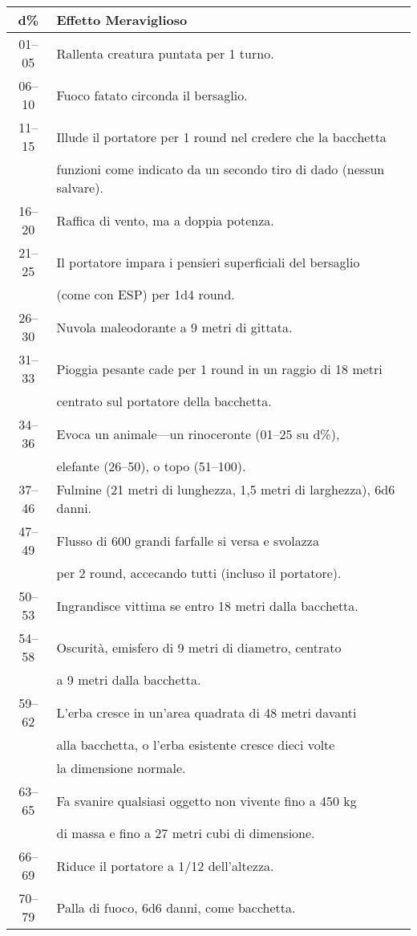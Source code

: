 \documentclass{article}
\begin{document}
\begin{multicols}{2}
\begin{table}[h]
\centering
\begin{tabular}{|c|l|}
\hline
\textbf{d\%} & \textbf{Effetto Meraviglioso} \\
\hline
01–05 & Rallenta creatura puntata per 1 turno. \\
06–10 & Fuoco fatato circonda il bersaglio. \\
11–15 & Illude il portatore per 1 round nel credere che la bacchetta \\
& funzioni come indicato da un secondo tiro di dado (nessun salvare). \\
16–20 & Raffica di vento, ma a doppia potenza. \\
21–25 & Il portatore impara i pensieri superficiali del bersaglio \\
& (come con ESP) per 1d4 round. \\
26–30 & Nuvola maleodorante a 9 metri di gittata. \\
31–33 & Pioggia pesante cade per 1 round in un raggio di 18 metri \\
& centrato sul portatore della bacchetta. \\
34–36 & Evoca un animale—un rinoceronte (01–25 su d\%), \\
& elefante (26–50), o topo (51–100). \\
37–46 & Fulmine (21 metri di lunghezza, 1,5 metri di larghezza), 6d6 danni. \\
47–49 & Flusso di 600 grandi farfalle si versa e svolazza \\
& per 2 round, accecando tutti (incluso il portatore). \\
50–53 & Ingrandisce vittima se entro 18 metri dalla bacchetta. \\
54–58 & Oscurità, emisfero di 9 metri di diametro, centrato \\
& a 9 metri dalla bacchetta. \\
59–62 & L'erba cresce in un'area quadrata di 48 metri davanti \\
& alla bacchetta, o l'erba esistente cresce dieci volte \\
& la dimensione normale. \\
63–65 & Fa svanire qualsiasi oggetto non vivente fino a 450 kg \\
& di massa e fino a 27 metri cubi di dimensione. \\
66–69 & Riduce il portatore a 1/12 dell'altezza. \\
70–79 & Palla di fuoco, 6d6 danni, come bacchetta. \\

\end{tabular}
\end{table}
\end{multicols}
\end{document}
